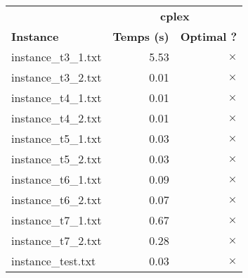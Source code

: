 \documentclass{article}
\begin{document}
\begin{center}
\renewcommand{\arraystretch}{1.4} 
 \begin{tabular}{lrr}
	\hline
 & \multicolumn{2}{c}{\textbf{cplex}}\\
\textbf{Instance}  & \textbf{Temps (s)} & \textbf{Optimal ?} \\\hline

instance\_t3\_1.txt & 5.53 & 
$\times$
\\
instance\_t3\_2.txt & 0.01 & 
$\times$
\\
instance\_t4\_1.txt & 0.01 & 
$\times$
\\
instance\_t4\_2.txt & 0.01 & 
$\times$
\\
instance\_t5\_1.txt & 0.03 & 
$\times$
\\
instance\_t5\_2.txt & 0.03 & 
$\times$
\\
instance\_t6\_1.txt & 0.09 & 
$\times$
\\
instance\_t6\_2.txt & 0.07 & 
$\times$
\\
instance\_t7\_1.txt & 0.67 & 
$\times$
\\
instance\_t7\_2.txt & 0.28 & 
$\times$
\\
instance\_test.txt & 0.03 & 
$\times$
\\
\hline\end{tabular}
\end{center}
\end{document}
